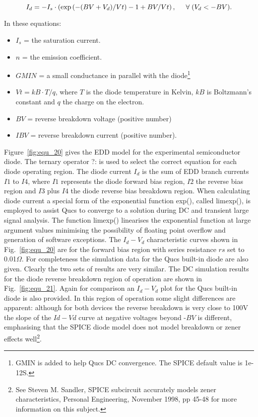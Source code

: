 \begin{equation}
 I_{d} = -I_{s}\cdot \left( \exp\left(-(BV+V_{d})/Vt\right)-1+BV/Vt\right), \hspace{5mm} \forall\; (V_{d } < -BV).
\end{equation} 

\vspace{3mm}

In these equations:
\begin{itemize}
 \item $I_{s}$ = the saturation current.
 \item $n$ = the emission coefficient.
 \item $GMIN$ = a small conductance in parallel with the diode\footnote{GMIN is added to help Qucs DC convergence. The SPICE default value is 1e-12S.}
 \item $Vt = kB\cdot T/q$, where $T$ is the diode temperature in Kelvin, $kB$ is Boltzmann's constant and $q$ the charge on the electron.
 \item $BV$ = reverse breakdown voltage (positive number) 
 \item $IBV$ = reverse breakdown current (positive number).
\end{itemize}

Figure~\ref{fig:equ_20} gives the EDD model for the experimental
semiconductor diode. The ternary operator ?: is used to select the
correct equation for each diode operating region. The diode current $I_d$
is the sum of EDD branch currents $I1$ to $I4$, where $I1$ represents the
diode forward bias region, $I2$ the reverse bias region and $I3$ plus $I4$
the diode reverse bias breakdown region. When calculating diode
current a special form of the exponential function exp(), called
limexp(), is employed to assist Qucs to converge to a solution during
DC and transient large signal analysis. The function limexp()
linearises the exponential function at large argument values
minimising the possibility of floating point overflow and generation
of software exceptions. The $I_{d}-V_{d}$ characteristic curves shown
in Fig.~\ref{fig:equ_20} are for the forward bias region with series
resistance $rs$ set to 0.01$\Omega$. For completeness the simulation
data for the Qucs built-in diode are also given. Clearly the two sets
of results are very similar. The DC simulation results for the diode
reverse breakdown region of operation are shown in
Fig.~\ref{fig:equ_21}. Again for comparison an $I_{d}-V_{d}$ plot for
the Qucs built-in diode is also provided. In this region of operation
some slight differences are apparent: although for both devices the
reverse breakdown is very close to 100V the slope of the $Id-Vd$ curve
at negative voltages beyond -$BV$ is different, emphasising that the
SPICE diode model does not model breakdown or zener effects
well\footnote{See Steven M. Sandler, SPICE subcircuit accurately
models zener characteristics, Personal Engineering, November 1998, pp
45-48 for more information on this subject.}.

